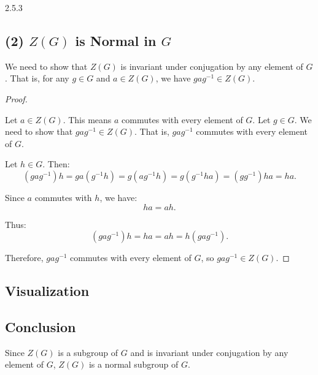 \documentclass[12pt]{amsart}
\theoremstyle{definition}
\numberwithin{equation}{section}
\begin{document}
\begin{exercise}{2.5.3}
    \subsection*{(2) \(Z(G)\) is Normal in \(G\)}
    
    We need to show that \(Z(G)\) is invariant under conjugation by any element of \(G\). That is, for any \(g \in G\) and \(a \in Z(G)\), we have \(gag^{-1} \in Z(G)\).
    
    \begin{proof} \(\)
    
    Let \(a \in Z(G)\). This means \(a\) commutes with every element of \(G\). Let \(g \in G\). We need to show that \(gag^{-1} \in Z(G)\). That is, \(gag^{-1}\) commutes with every element of \(G\).
    
    Let \(h \in G\). Then:
    \[
    (gag^{-1})h = ga(g^{-1}h) = g(ag^{-1}h) = g(g^{-1}ha) = (gg^{-1})ha = ha.
    \]
    
    Since \(a\) commutes with \(h\), we have:
    \[
    ha = ah.
    \]
    
    Thus:
    \[
    (gag^{-1})h = ha = ah = h(gag^{-1}).
    \]
    
    Therefore, \(gag^{-1}\) commutes with every element of \(G\), so \(gag^{-1} \in Z(G)\).
    
    \end{proof}
    
    \subsection*{Visualization}

    \begin{center}
    \end{center}
    
    \subsection*{Conclusion}
    
    Since \(Z(G)\) is a subgroup of \(G\) and is invariant under conjugation by any element of \(G\), \(Z(G)\) is a normal subgroup of \(G\).
    
\end{exercise}
\newpage
\end{document}
